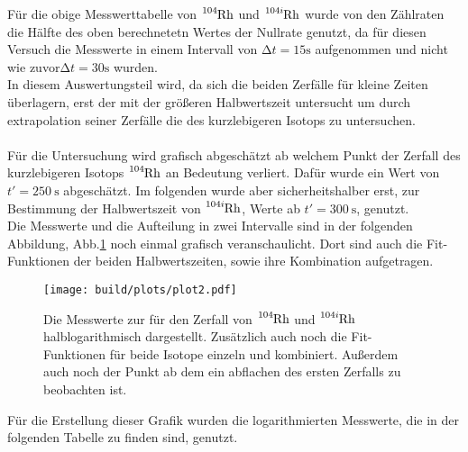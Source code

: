 Für die obige Messwerttabelle von $\ce{^{104}_{}Rh}$ und $\ce{^{104i}_{}Rh}$ wurde von den Zählraten die Hälfte des oben berechnetetn Wertes der Nullrate genutzt, 
da für diesen Versuch die Messwerte in einem Intervall von $\increment t=15 \si{\second}$ aufgenommen und nicht wie zuvor$\increment t=30\si{\second}$ wurden.\\
In diesem Auswertungsteil wird, da sich die beiden Zerfälle für kleine Zeiten überlagern, erst der mit der größeren Halbwertszeit untersucht um durch extrapolation seiner Zerfälle
die des kurzlebigeren Isotops zu untersuchen.\\\\
\noindent
Für die Untersuchung wird grafisch abgeschätzt ab welchem Punkt der Zerfall des kurzlebigeren Isotops $\ce{^{104}_{}Rh}$ an Bedeutung verliert. 
Dafür wurde ein Wert von $t' =\SI{250}{\second} $ abgeschätzt. Im folgenden wurde aber sicherheitshalber erst, zur Bestimmung der Halbwertszeit von $\ce{^{104i}_{}Rh}$, Werte ab  $t' =\SI{300}{\second} $, genutzt.\\
Die Messwerte und die Aufteilung in zwei Intervalle sind in der folgenden Abbildung, Abb.\ref{img:Rh1} noch einmal grafisch veranschaulicht.
Dort sind auch die Fit-Funktionen der beiden Halbwertszeiten, sowie ihre Kombination aufgetragen.

\begin{figure}[H]
    \centering
    \texttt{[image: build/plots/plot2.pdf]}
    \caption{Die Messwerte zur für den Zerfall von $\ce{^{104}_{}Rh}$ und $\ce{^{104i}_{}Rh}$ halblogarithmisch dargestellt. Zusätzlich auch noch die Fit-Funktionen für beide Isotope einzeln und kombiniert. Außerdem auch noch der Punkt ab dem ein abflachen des ersten Zerfalls zu beobachten ist.}
    \label{img:Rh1}
\end{figure}
\noindent

Für die Erstellung dieser Grafik wurden die logarithmierten Messwerte, die in der folgenden Tabelle zu finden sind, genutzt.

